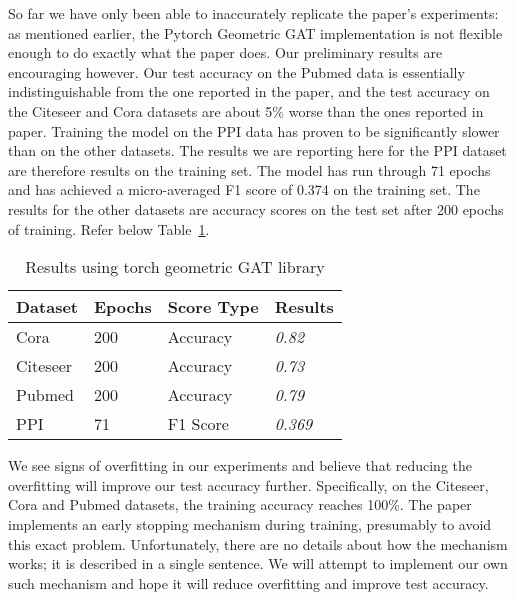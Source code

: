 So far we have only been able to inaccurately replicate the paper's
experiments: as mentioned earlier, the Pytorch Geometric GAT implementation is
not flexible enough to do exactly what the paper does.
Our preliminary results are encouraging however.
Our test accuracy on the Pubmed data is essentially
indistinguishable from the one reported in the paper, and the test accuracy on
the Citeseer and Cora datasets are about 5\% worse than the ones reported in
paper.
Training the model on the PPI data has proven to be significantly slower than on
the other datasets. The results we are reporting here for the PPI dataset are
therefore results on the training set. The model has run through 71 epochs and
has achieved a micro-averaged F1 score of 0.374 on the training set. The results
for the other datasets are accuracy scores on the test set after 200 epochs of
training.
Refer below Table~\ref{tab:results-table}.

\begin{table}[]
    \centering
    \begin{tabular}{@{}llll@{}}
        \toprule
        \textbf{Dataset} & \textbf{Epochs} & \textbf{Score Type} & \textbf{Results} \\
        \midrule
        Cora             & 200             & Accuracy            & \textit{0.82}    \\
        Citeseer         & 200             & Accuracy            & \textit{0.73}    \\
        Pubmed           & 200             & Accuracy            & \textit{0.79}    \\
        PPI              & 71             & F1 Score            & \textit{0.369}   \\
        \bottomrule

    \end{tabular}
    \caption{Results using torch geometric GAT library}
    \label{tab:results-table}
\end{table}

We see signs of overfitting in our experiments and believe that reducing the
overfitting will improve our test accuracy further.
Specifically, on the Citeseer, Cora and Pubmed datasets, the training accuracy reaches 100\%.
The paper implements an early stopping mechanism during training, presumably to
avoid this exact problem.
Unfortunately, there are no details about how the mechanism works;
it is described in a single sentence.
We will attempt to implement our own such mechanism and hope it will reduce overfitting and
improve test accuracy.
